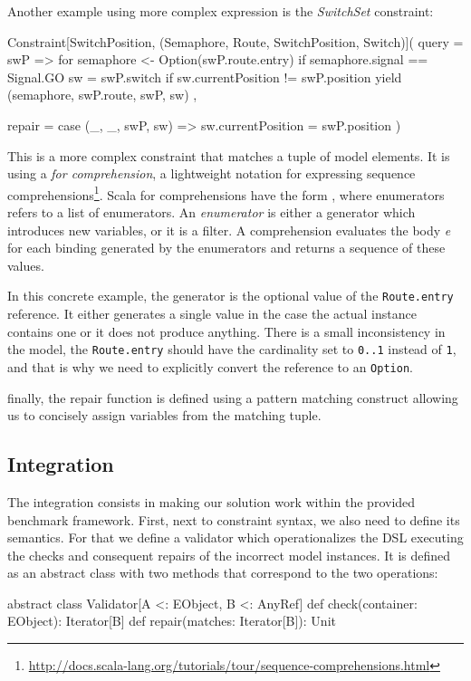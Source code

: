 Another example using more complex expression is the \emph{SwitchSet} constraint:
%
\begin{scalacode}
Constraint[SwitchPosition, (Semaphore, Route, SwitchPosition, Switch)](
  query = swP => {
    for {
      semaphore <- Option(swP.route.entry) if semaphore.signal == Signal.GO
      sw = swP.switch if sw.currentPosition != swP.position
    } yield (semaphore, swP.route, swP, sw)
  },

  repair = {
    case (_, _, swP, sw) => sw.currentPosition = swP.position
  }
)
\end{scalacode}
%
This is a more complex constraint that matches a tuple of model elements.
It is using a \emph{for comprehension}, a lightweight notation for expressing sequence comprehensions\footnote{\url{http://docs.scala-lang.org/tutorials/tour/sequence-comprehensions.html}}.
Scala for comprehensions have the form , where enumerators refers to a list of enumerators.
An \emph{enumerator} is either a generator which introduces new variables, or it is a filter.
A comprehension evaluates the body \emph{e} for each binding generated by the enumerators and returns a sequence of these values.

In this concrete example, the generator is the optional value of the \texttt{Route.entry} reference.
It either generates a single value in the case the actual instance contains one or it does not produce anything.
There is a small inconsistency in the model, the \texttt{Route.entry} should have the cardinality set to \texttt{0..1} instead of \texttt{1}, and that is why we need to explicitly convert the reference to an \texttt{Option}.

finally, the repair function is defined using a pattern matching construct allowing us to concisely assign variables from the matching tuple.

\subsection{Integration}

The integration consists in making our solution work within the provided benchmark framework.
First, next to constraint syntax, we also need to define its semantics.
For that we define a validator which operationalizes the DSL executing the checks and consequent repairs of the incorrect model instances.
It is defined as an abstract class with two methods that correspond to the two operations:
%
\begin{scalacode}
abstract class Validator[A <: EObject, B <: AnyRef] {
  def check(container: EObject): Iterator[B]
  def repair(matches: Iterator[B]): Unit
}
\end{scalacode}
%

